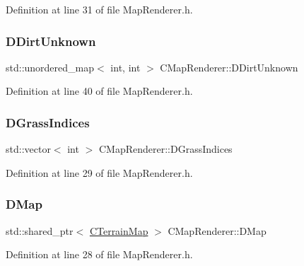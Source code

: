 Definition at line 31 of file Map\+Renderer.\+h.

\hypertarget{classCMapRenderer_ab899664d372da1c8e4b5802c9e720173}{}\label{classCMapRenderer_ab899664d372da1c8e4b5802c9e720173} 
\subsubsection{\texorpdfstring{D\+Dirt\+Unknown}{DDirtUnknown}}
{\footnotesize\ttfamily std\+::unordered\+\_\+map$<$ int, int $>$ C\+Map\+Renderer\+::\+D\+Dirt\+Unknown\hspace{0.3cm}{\ttfamily [protected]}}



Definition at line 40 of file Map\+Renderer.\+h.

\hypertarget{classCMapRenderer_abea42ed77fce8a53ef0cfd6c82a5d676}{}\label{classCMapRenderer_abea42ed77fce8a53ef0cfd6c82a5d676} 
\subsubsection{\texorpdfstring{D\+Grass\+Indices}{DGrassIndices}}
{\footnotesize\ttfamily std\+::vector$<$ int $>$ C\+Map\+Renderer\+::\+D\+Grass\+Indices\hspace{0.3cm}{\ttfamily [protected]}}



Definition at line 29 of file Map\+Renderer.\+h.

\hypertarget{classCMapRenderer_ab9a199c61aa1c87a3248af3085d8ba52}{}\label{classCMapRenderer_ab9a199c61aa1c87a3248af3085d8ba52} 
\subsubsection{\texorpdfstring{D\+Map}{DMap}}
{\footnotesize\ttfamily std\+::shared\+\_\+ptr$<$ \hyperlink{classCTerrainMap}{C\+Terrain\+Map} $>$ C\+Map\+Renderer\+::\+D\+Map\hspace{0.3cm}{\ttfamily [protected]}}



Definition at line 28 of file Map\+Renderer.\+h.

